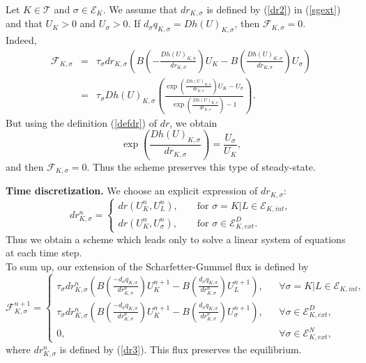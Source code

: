 \documentclass[smallextended]{svjour3}
\newcommand{\ds}{\displaystyle}
\begin{document}
\begin{remark}
Let $K \in \mathcal{T}$ and $\sigma \in \mathcal{E}_{K}$. We assume that $dr_{K,\sigma}$ is defined by (\ref{dr2}) in (\ref{sgext}) and that $U_{K}>0$ and $U_{\sigma}>0$. If $d_{\sigma}q_{K,\sigma}=Dh(U)_{K,\sigma}$, then $\mathcal{F}_{K,\sigma}=0$.\\
Indeed, 
\begin{eqnarray*}
\mathcal{F}_{K,\sigma} & = & \tau_{\sigma}dr_{K,\sigma}\left(B\left(-\frac{Dh(U)_{K,\sigma}}{dr_{K,\sigma}}\right)U_{K}-B\left(\frac{Dh(U)_{K,\sigma}}{dr_{K,\sigma}}\right)U_{\sigma}\right)\\
&=& \tau_{\sigma}Dh(U)_{K,\sigma}\left(\frac{\exp\left(\ds{\frac{Dh(U)_{K,\sigma}}{dr_{K,\sigma}}}\right)U_{K}-U_{\sigma}}{\exp\left(\ds{\frac{Dh(U)_{K,\sigma}}{dr_{K,\sigma}}}\right)-1}\right).
\end{eqnarray*}
But using the definition (\ref{defdr}) of $dr$, we obtain
\begin{equation*}
\exp\left(\ds{\frac{Dh(U)_{K,\sigma}}{dr_{K,\sigma}}}\right)=\frac{U_{\sigma}}{U_{K}},
\end{equation*}
and then $ \mathcal{F}_{K,\sigma}=0$. Thus the scheme preserves this type of steady-state.
\end{remark}
\textbf{Time discretization.} We choose an explicit expression of $dr_{K,\sigma}$:
\begin{equation}
dr_{K,\sigma}^{n}=\left\{\begin{array}{lll} dr(U_{K}^{n},U_{L}^{n}), & & \text{ for } \sigma=K|L \in \mathcal{E}_{K,int}, \\ dr(U_{K}^{n},U_{\sigma}^{n}), & & \text{ for } \sigma \in \mathcal{E}_{K,ext}^{D}.\end{array}\right.
\label{dr3}
\end{equation}
Thus we obtain a scheme which leads only to solve a linear system of equations at each time step.\\
To sum up, our extension of the Scharfetter-Gummel flux is defined by
\begin{equation}
\mathcal{F}_{K,\sigma}^{n+1}=\left\{\begin{array}{lcl} \tau_{\sigma} dr_{K,\sigma}^{n} \left(B\left(\ds{\frac{-d_{\sigma}q_{K,\sigma}}{dr_{K,\sigma}^{n}}}\right)U_{K}^{n+1}-B\left(\ds{\frac{d_{\sigma}q_{K,\sigma}}{dr_{K,\sigma}^{n}}}\right)U_{L}^{n+1}\right), & & \forall \sigma=K|L \in \mathcal{E}_{K,int}, \\ \tau_{\sigma} dr_{K,\sigma}^{n} \left(B\left(\ds{\frac{-d_{\sigma}q_{K,\sigma}}{dr_{K,\sigma}^{n}}}\right)U_{K}^{n+1}-B\left(\ds{\frac{d_{\sigma}q_{K,\sigma}}{dr_{K,\sigma}^{n}}}\right)U_{\sigma}^{n+1}\right), & & \forall \sigma \in \mathcal{E}_{K,ext}^{D}, \\ 0, & & \forall \sigma \in \mathcal{E}_{K,ext}^{N},\end{array}\right.
\label{flux}
\end{equation}
where $dr_{K,\sigma}^{n}$ is defined by (\ref{dr3}). This flux preserves the equilibrium.
\end{document}

